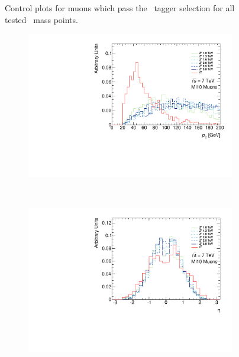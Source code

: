 \begin{figure}
\caption{Control plots for muons which pass the \xsm\ tagger selection for all tested \Zprime\ mass points.} \label{fig:BoostedControlMI10}
\end{figure}

\begin{figure}
\begin{subfigure}{0.49\linewidth}
\includegraphics[width=\textwidth]{PartBoosted/Plots/h_mi10_pt.pdf}
\end{subfigure}
~
\begin{subfigure}{0.49\linewidth}
\includegraphics[width=\textwidth]{PartBoosted/Plots/h_mi10_eta.pdf}
\end{subfigure}


\end{figure}
